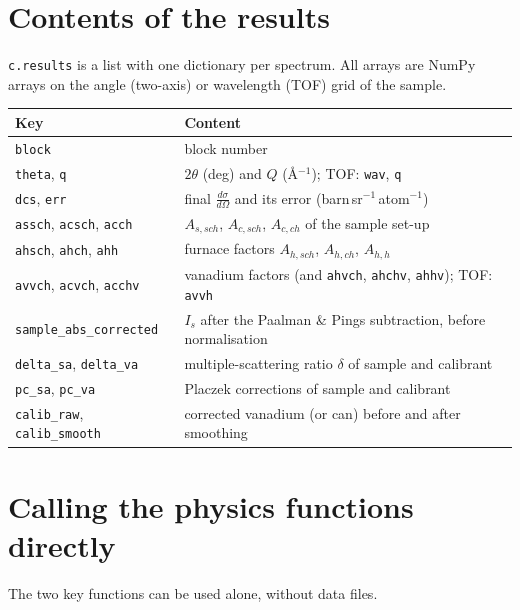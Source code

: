 \documentclass[11pt,a4paper]{report}
\newcommand{\code}[1]{\texttt{#1}}
\newcommand{\dsig}{\frac{d\sigma}{d\Omega}}
\begin{document}
\section{Contents of the results}

\code{c.results} is a list with one dictionary per spectrum. All arrays are
NumPy arrays on the angle (two-axis) or wavelength (TOF) grid of the sample.

\begin{longtable}{@{}>{\raggedright\arraybackslash}p{5.2cm} >{\raggedright\arraybackslash}p{10.2cm}@{}}
\toprule
Key & Content \\
\midrule
\endhead
\code{block} & block number \\
\code{theta}, \code{q} & $2\theta$ (deg) and $Q$ (\AA$^{-1}$); TOF: \code{wav}, \code{q} \\
\code{dcs}, \code{err} & final $\dsig$ and its error (barn\,sr$^{-1}$\,atom$^{-1}$) \\
\code{assch}, \code{acsch}, \code{acch} & $A_{s,sch}$, $A_{c,sch}$, $A_{c,ch}$ of the sample set-up \\
\code{ahsch}, \code{ahch}, \code{ahh} & furnace factors $A_{h,sch}$, $A_{h,ch}$, $A_{h,h}$ \\
\code{avvch}, \code{acvch}, \code{acchv} & vanadium factors (and \code{ahvch}, \code{ahchv}, \code{ahhv}); TOF: \code{avvh} \\
\code{sample\_abs\_corrected} & $I_s$ after the Paalman \& Pings subtraction, before normalisation \\
\code{delta\_sa}, \code{delta\_va} & multiple-scattering ratio $\delta$ of sample and calibrant \\
\code{pc\_sa}, \code{pc\_va} & Placzek corrections of sample and calibrant \\
\code{calib\_raw}, \code{calib\_smooth} & corrected vanadium (or can) before and after smoothing \\
\bottomrule
\end{longtable}

\section{Calling the physics functions directly}

The two key functions can be used alone, without data files.
\end{document}
